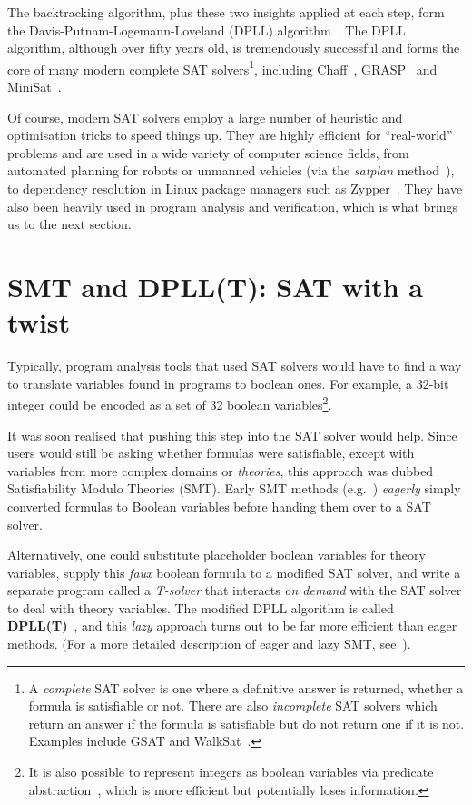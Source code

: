 The backtracking algorithm, plus these two insights applied at each step, form
the Davis-Putnam-Logemann-Loveland (DPLL) algorithm~\cite{dpll1,dpll2}. The
DPLL algorithm, although over fifty years old, is tremendously successful and
forms the core of many modern complete SAT solvers\footnote{A
\textit{complete} SAT solver is one where a definitive answer is returned,
whether a formula is satisfiable or not. There are also \textit{incomplete}
SAT solvers which return an answer if the formula is satisfiable but do not
return one if it is not. Examples include GSAT and WalkSat~\cite{walksat}.},
including Chaff~\cite{chaff}, GRASP~\cite{grasp} and MiniSat~\cite{minisat}.

Of course, modern SAT solvers employ a large number of heuristic and
optimisation tricks to speed things up. They are highly efficient for
``real-world'' problems and are used in a wide variety of computer science fields,
from automated planning for robots or unmanned vehicles (via the
\textit{satplan} method~\cite{satplan}), to dependency resolution in Linux
package managers such as Zypper~\cite{zypper}. They have also been heavily used in 
program analysis and verification, which is what brings us to the next section.

\section{SMT and DPLL(T): SAT with a twist}

Typically, program analysis tools that used SAT solvers would have to find a
way to translate variables found in programs to boolean ones. For example, a
32-bit integer could be encoded as a set of 32 boolean variables\footnote{It
is also possible to represent integers as boolean variables via predicate
abstraction~\cite{slam}, which is more efficient but potentially loses
information.}.

It was soon realised that pushing this step into the SAT solver would help.
Since users would still be asking whether formulas were satisfiable, except
with variables from more complex domains or \textit{theories}, this approach
was dubbed Satisfiability Modulo Theories (SMT). Early SMT methods
(e.g.~\cite{proc-verification,uclid}) \textit{eagerly} simply converted formulas to
Boolean variables before handing them over to a SAT solver.

Alternatively, one could substitute placeholder boolean variables for theory
variables, supply this \textit{faux} boolean formula to a modified SAT solver,
and write a separate program called a \textit{T-solver} that interacts
\textit{on demand} with the SAT solver to deal with theory variables. The
modified DPLL algorithm is called \textbf{DPLL(T)}~\cite{dpllt:04}, and this
\textit{lazy} approach turns out to be far more efficient than eager methods.
(For a more detailed description of eager and lazy SMT,
see~\cite[Section~3.2]{abstract-dpll}).

